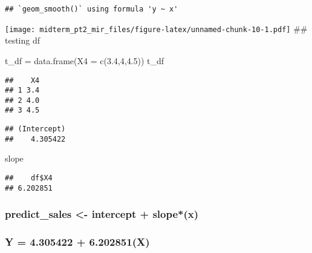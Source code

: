 \documentclass[
]{article}
\newenvironment{Shaded}{\begin{snugshade}}{\end{snugshade}}
\newcommand{\AttributeTok}[1]{\textcolor[rgb]{0.77,0.63,0.00}{#1}}
\newcommand{\DecValTok}[1]{\textcolor[rgb]{0.00,0.00,0.81}{#1}}
\newcommand{\FloatTok}[1]{\textcolor[rgb]{0.00,0.00,0.81}{#1}}
\newcommand{\FunctionTok}[1]{\textcolor[rgb]{0.00,0.00,0.00}{#1}}
\newcommand{\NormalTok}[1]{#1}
\newcommand{\OtherTok}[1]{\textcolor[rgb]{0.56,0.35,0.01}{#1}}
\newcommand{\SpecialCharTok}[1]{\textcolor[rgb]{0.00,0.00,0.00}{#1}}
\begin{document}
\begin{verbatim}
## `geom_smooth()` using formula 'y ~ x'
\end{verbatim}

\texttt{[image: midterm\_pt2\_mir\_files/figure-latex/unnamed-chunk-10-1.pdf]}
\#\# testing df

\begin{Shaded}
\begin{Highlighting}[]
\NormalTok{t\_df }\OtherTok{=} \FunctionTok{data.frame}\NormalTok{(}\AttributeTok{X4 =} \FunctionTok{c}\NormalTok{(}\FloatTok{3.4}\NormalTok{,}\DecValTok{4}\NormalTok{,}\FloatTok{4.5}\NormalTok{))}
\NormalTok{t\_df}
\end{Highlighting}
\end{Shaded}

\begin{verbatim}
##    X4
## 1 3.4
## 2 4.0
## 3 4.5
\end{verbatim}

\begin{Shaded}
\end{Shaded}

\begin{verbatim}
## (Intercept) 
##    4.305422
\end{verbatim}

\begin{Shaded}
\begin{Highlighting}[]
\NormalTok{slope}
\end{Highlighting}
\end{Shaded}

\begin{verbatim}
##    df$X4 
## 6.202851
\end{verbatim}

\hypertarget{predict_sales---intercept-slopex}{%
\subsubsection{predict\_sales \textless- intercept +
slope*(x)}\label{predict_sales---intercept-slopex}}

\hypertarget{y-4.305422-6.202851x}{%
\subsubsection{Y = 4.305422 + 6.202851(X)}\label{y-4.305422-6.202851x}}
\end{document}
